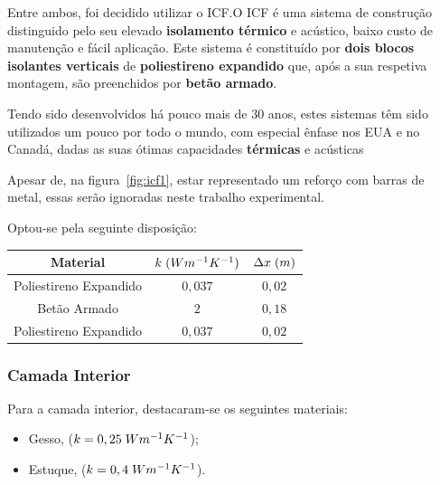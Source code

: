 \documentclass[12pt, a4paper]{article}
\begin{document}
Entre ambos, foi decidido utilizar o ICF.\@ O ICF é uma sistema de construção distinguido pelo seu elevado
\textbf{isolamento térmico} e acústico, baixo custo de manutenção e fácil aplicação. Este sistema é constituído por
\textbf{dois blocos isolantes verticais} de \textbf{poliestireno expandido} que, após a sua respetiva montagem,
são preenchidos por \textbf{betão armado}.


Tendo sido desenvolvidos há pouco mais de 30 anos, estes sistemas têm sido utilizados um pouco por todo o mundo,
com especial ênfase nos EUA e no Canadá, dadas as suas ótimas capacidades \textbf{térmicas} e acústicas

Apesar de, na figura~\ref{fig:icf1}, estar representado um reforço com barras de metal, essas serão
ignoradas neste trabalho experimental.

Optou-se pela seguinte disposição:

\begin{center}
	\begin{tabular}{||c c c||}
		\hline
		Material               & $k \hspace{1mm} (Wm^{-1}K^{-1})$ & $\Delta x \hspace{1mm} (m)$ \\ [0.5ex]
		\hline\hline
		Poliestireno Expandido & $0,037$                          & $0,02$                      \\
		\hline
		Betão Armado           & $2$                              & $0,18$                      \\
		\hline
		Poliestireno Expandido & $0,037$                          & $0,02$                      \\
		\hline
	\end{tabular}
\end{center}

\subsubsection{Camada Interior}\label{pext_ci}

Para a camada interior, destacaram-se os seguintes materiais:

\begin{center}
	\begin{itemize}
		\item Gesso, ($k=0,25 \hspace{1mm} Wm^{-1}K^{-1}$);
		\item Estuque, ($k=0,4 \hspace{1mm} Wm^{-1}K^{-1}$).
	\end{itemize}
\end{center}
\end{document}
